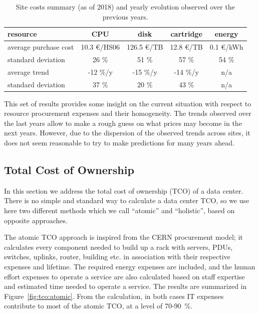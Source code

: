 \begin{table}[h]
    \centering
    \caption{Site costs summary (as of 2018) and yearly evolution observed over the previous years.}
    \label{tab:sitecosts}
    \begin{tabular}{lcccc}
        \hline
        resource & CPU & disk & cartridge & energy \\\hline
        average purchase cost & 10.3 \euro/HS06 & 126.5 \euro/TB & 12.8 \euro/TB & 0.1 \euro/kWh\\
        standard deviation & 26 \% & 51 \% & 57 \% & 54 \% \\
        average trend & -12 \%/y & -15 \%/y & -14 \%/y & n/a \\
        standard deviation & 37 \% & 20 \% & 43 \% & n/a \\\hline
    \end{tabular}
\end{table}


This set of results provides some insight on the current situation
with respect to resource procurement expenses and their
homogeneity. The trends observed over the last years allow to make a
rough guess on what prices may become in the next years. However, due
to the dispersion of the observed trends across sites, it does not seem
reasonable to try to make predictions for many years ahead.

\subsection{\label{sec:sitecost:tco}Total Cost of Ownership}

In this section we address the total cost of ownership (TCO) of a data
center.  There is no simple and standard way to calculate a data
center TCO, so we use here two different methods which we call
``atomic'' and ``holistic'', based on opposite approaches.

The atomic TCO approach is inspired from the CERN procurement model;
it calculates every component needed to build up a rack with servers,
PDUs, switches, uplinks, router, building etc. in association with
their respective expenses and lifetime.  The required energy expenses
are included, and the human effort expenses to operate a service are
also calculated based on staff expertise and estimated time needed to
operate a service.  The results are summarized in
Figure~\ref{fig:tco:atomic}.  From the calculation, in both cases IT
expenses contribute to most of the atomic TCO, at a level of 70-90~\%.


